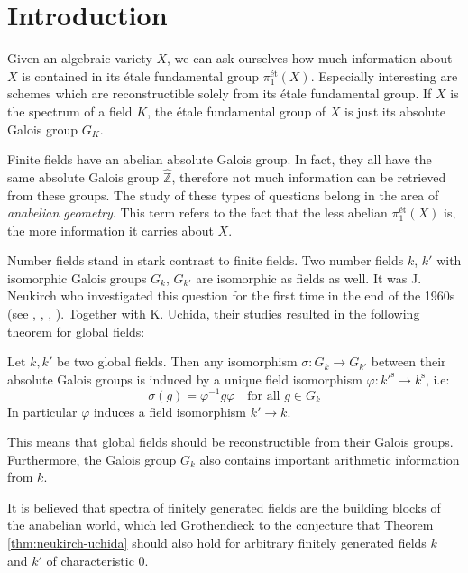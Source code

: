 \chapter{Introduction}

Given an algebraic variety $X$, we can ask ourselves how much information about $X$ is contained in its étale fundamental group $\pi_1^{\text{ét}}(X)$. Especially interesting are schemes which are reconstructible solely from its étale fundamental group. If $X$ is the spectrum of a field $K$, the étale fundamental group of $X$ is just its absolute Galois group $G_K$. 

Finite fields have an abelian absolute Galois group. In fact, they all have the same absolute Galois group $\widehat{\mathbb{Z}}$, therefore not much information can be retrieved from these groups. The study of these types of questions belong in the area of \textit{anabelian geometry}. This term refers to the fact that the less abelian $\pi_1^\text{ét}(X)$ is, the more information it carries about $X$.

Number fields stand in stark contrast to finite fields. Two number fields $k$, $k'$ with isomorphic Galois groups $G_k$, $G_{k'}$ are isomorphic as fields as well. It was J. Neukirch who investigated this question for the first time in the end of the 1960s (see \cite{Ne69}, \cite{Uc76}, \cite{Ne77}, \cite{Uc77}). Together with K. Uchida, their studies resulted in the following theorem for global fields:

\begin{theorem}\label{thm:neukirch-uchida}
Let $k,k'$ be two global fields. Then any isomorphism $\sigma: G_k\to G_{k'}$ between their absolute Galois groups is induced by a unique field isomorphism $\varphi: k'^{\text{s}}\to k^\text{s}$, i.e: 
\[\sigma(g) =\varphi^{-1}g\varphi \quad \text{for all }g\in G_k\] 
In particular $\varphi$ induces a field isomorphism $k'\to k$.
\end{theorem}

This means that global fields should be reconstructible from their Galois groups. Furthermore, the Galois group $G_k$ also contains important arithmetic information from $k$. 

It is believed that spectra of finitely generated fields are the building blocks of the anabelian world, which led Grothendieck to the conjecture that Theorem \ref{thm:neukirch-uchida} should also hold for arbitrary finitely generated fields $k$ and $k'$ of characteristic $0$.

